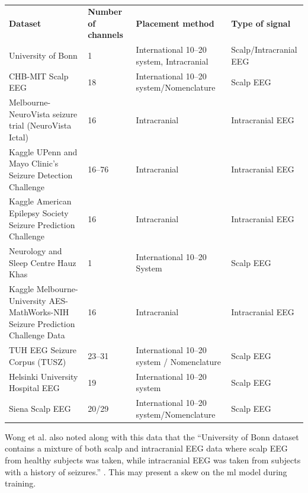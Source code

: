 \documentclass[12pt]{article}
\begin{document}
\begin{table}[H]
\centering
\begin{tabular}{p{}p{}p{}p{}}
\textbf{Dataset}                                              & \textbf{Number of channels} & \textbf{Placement method}                & \textbf{Type of signal} \\
University of Bonn                                            & 1                           & International 10–20 system, Intracranial & Scalp/Intracranial EEG  \\
CHB-MIT Scalp EEG                                             & 18                          & International 10–20 system/Nomenclature  & Scalp EEG               \\
Melbourne-NeuroVista seizure trial (NeuroVista Ictal)         & 16                          & Intracranial                             & Intracranial EEG        \\
Kaggle UPenn and Mayo Clinic's Seizure Detection Challenge    & 16–76                       & Intracranial                             & Intracranial EEG        \\
Kaggle American Epilepsy Society Seizure Prediction Challenge & 16                          & Intracranial                             & Intracranial EEG        \\
Neurology and Sleep Centre Hauz Khas                          & 1                           & International 10–20 System               & Scalp EEG               \\
Kaggle Melbourne-University AES-MathWorks-NIH Seizure Prediction Challenge Data & 16 & Intracranial & Intracranial EEG \\
TUH EEG Seizure Corpus (TUSZ)                                 & 23–31                       & International 10–20 system / Nomenclature & Scalp EEG               \\
Helsinki University Hospital EEG                              & 19                          & International 10–20 system               & Scalp EEG               \\
Siena Scalp EEG                                               & 20/29                       & International 10–20 system/Nomenclature  & Scalp EEG              
\end{tabular}
\caption{\protect\cite{wong2023eeg}}
\end{table}

Wong et al. also noted along with this data that the ``University of Bonn dataset contains a mixture of both scalp and intracranial EEG data where scalp EEG from healthy subjects was taken, while intracranial EEG was taken from subjects with a history of seizures.'' \cite{wong2023eeg}. This may present a skew on the \acrshort{ml} model during training.
\end{document}
